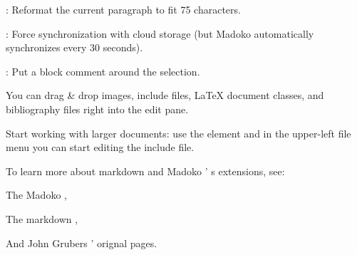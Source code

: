 \documentclass{book}
\begin{document}
\begin{mdUl}[class={list-star,compact},data-line={31}]%
\begin{mdLi}[data-line={31}]%
{}%
{}: Reformat the current paragraph to fit 75 characters.%
\end{mdLi}%
\begin{mdLi}[data-line={32}]%
{}%
{}: Force synchronization with cloud storage (but Madoko
automatically synchronizes every 30 seconds).%
\end{mdLi}%
\begin{mdLi}[data-line={34}]%
{}%
{}: Put a block comment around the selection.%
\end{mdLi}%
\begin{mdLi}[data-line={35}]%
{}You can drag%
{}{\&}%
{}drop images, include files, LaTeX document classes,
and bibliography files right into the edit pane.%
\end{mdLi}%
\begin{mdLi}[data-line={37}]%
{}Start working with larger documents: use the %
{}\mdCode[class={code,code1}]{[INCLUDE=my-chapter]}%
{}
element and in the upper-left file menu you can start editing the
{}%
{} include file.%
\end{mdLi}%
\end{mdUl}%
\begin{mdP}[class={para-continue},data-line={41}]%
{}To learn more about markdown and Madoko%
{}{'}%
{}s extensions, see:%
\end{mdP}%
\begin{mdUl}[class={list-star,compact},data-line={43}]%
\begin{mdLi}[data-line={43}]%
{}The Madoko%
{}{\mdNbsp}%
{},%
\end{mdLi}%
\begin{mdLi}[data-line={44}]%
{}The markdown%
{}{\mdNbsp}%
{},%
\end{mdLi}%
\begin{mdLi}[data-line={45}]%
{}And John Grubers%
{}{'}%
{} orignal%
{}{\mdNbsp}%
{} pages.%
\end{mdLi}%
\end{mdUl}%
\end{document}
